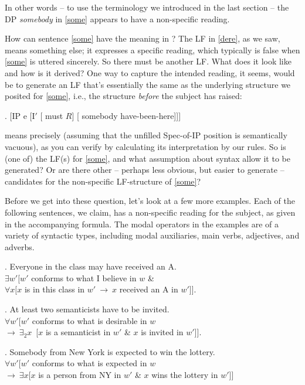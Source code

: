 In other words -- to use the terminology we introduced in the last section -- the DP \emph{somebody} in \ref{some} appears to have a non-specific reading.

How can sentence \ref{some} have the meaning in \Last? The LF in \ref{dere}, as we saw, means something else; it expresses a specific reading, which typically is false when \ref{some} is uttered sincerely. So there must be another LF. What does it look like and how is it derived? One way to capture the intended reading, it seems, would be to generate an LF that's essentially the same as the underlying structure we posited for \ref{some}, i.e., the structure \emph{before} the subject has raised:

\ex. [IP e [I$'$ [ must $R$] [ somebody have-been-here]]]

\Last means precisely \LLast (assuming that the unfilled Spec-of-IP position is semantically vacuous), as you can verify by calculating its interpretation by our rules. So is \Last (one of) the LF(s) for \ref{some}, and what assumption about syntax allow it to be generated? Or are there other -- perhaps less obvious, but easier to generate -- candidates for the non-specific LF-structure of \ref{some}?

Before we get into these question, let's look at a few more examples. Each of the following sentences, we claim, has a non-specific reading for the subject, as given in the accompanying formula. The modal operators in the examples are of a variety of syntactic types, including modal auxiliaries, main verbs, adjectives, and adverbs.

\ex. \label{everymay} Everyone in the class may have received an A.\\
$\exists w'[w'$ conforms to what I believe in $w$ \&\\
\null\hfill$\forall x[x$ is in this class in $w'\ \rightarrow\ x$ received an A in $w'$]].

\ex. At least two semanticists have to be invited.\\
$\forall w'[w'$ conforms to what is desirable in $w$\\
\null\hfill$ \rightarrow\ \exists_2 x$\ [$x$ is a semanticist in $w'$ \& $x$ is invited in $w'$]].

\ex. \label{ny} Somebody from New York is expected to win the lottery.\\
$\forall w'[w'$ conforms to what is expected in $w$\\
\null\hfill$ \rightarrow\ \exists x[x$ is a person from NY in $w'$ \& $x$ wins the lottery in $w'$]]

